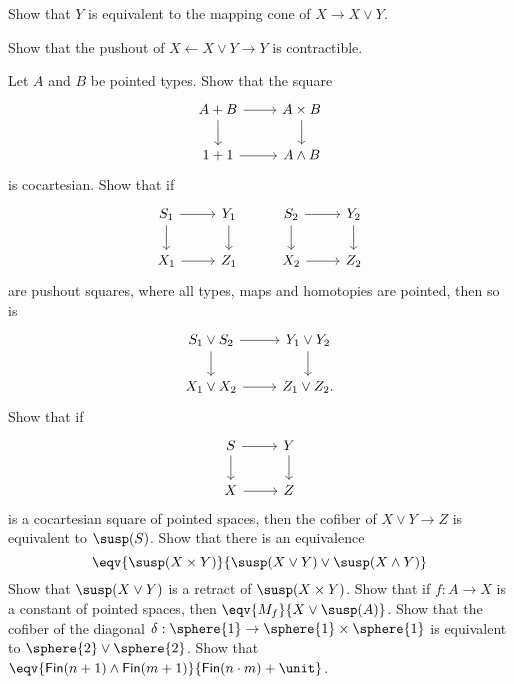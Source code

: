\begin{exercises}
\exercise 
\begin{subexenum}
\item Show that $Y$ is equivalent to the mapping cone of $X\to X\vee Y$.
\item Show that the pushout of $X \leftarrow X\vee Y \rightarrow Y$ is contractible.
\end{subexenum}
\exercise Let $A$ and $B$ be pointed types. Show that the square
\begin{equation*}
\begin{tikzcd}
A+B \arrow[r] \arrow[d] & A\times B \arrow[d] \\
1+1 \arrow[r] & A\wedge B
\end{tikzcd}
\end{equation*}
is cocartesian.
\exercise Show that if
\begin{equation*}
\begin{tikzcd}
S_1 \arrow[r] \arrow[d] & Y_1 \arrow[d] & S_2 \arrow[r] \arrow[d] & Y_2 \arrow[d] \\
X_1 \arrow[r] & Z_1 & X_2 \arrow[r] & Z_2
\end{tikzcd}
\end{equation*}
are pushout squares, where all types, maps and homotopies are pointed, then so is
\begin{equation*}
\begin{tikzcd}
S_1\vee S_2 \arrow[r] \arrow[d] & Y_1\vee Y_2 \arrow[d] \\
X_1 \vee X_2 \arrow[r] & Z_1\vee Z_2. 
\end{tikzcd}
\end{equation*}
\exercise Show that if
\begin{equation*}
\begin{tikzcd}
S \arrow[r] \arrow[d] & Y \arrow[d] \\
X \arrow[r] & Z
\end{tikzcd}
\end{equation*}
is a cocartesian square of pointed spaces, then the cofiber of $X\vee Y\to Z$ is equivalent to $\susp(S)$.
\exercise Show that there is an equivalence
\begin{equation*}
\eqv{\susp(X\times Y)}{\susp(X\vee Y)\vee \susp(X\wedge Y)}
\end{equation*}
\exercise Show that $\susp(X\vee Y)$ is a retract of $\susp(X\times Y)$. 
\exercise Show that if $f:A\to X$ is a constant of pointed spaces, then $\eqv{M_f}{X\vee \susp(A)}$. 
\exercise Show that the cofiber of the diagonal $\delta:\sphere{1}\to \sphere{1}\times\sphere{1}$ is equivalent to $\sphere{2}\vee\sphere{2}$.
\exercise Show that $\eqv{\mathsf{Fin}(n+1)\wedge \mathsf{Fin}(m+1)}{\mathsf{Fin}(n\cdot m)+\unit}$.
\end{exercises}
